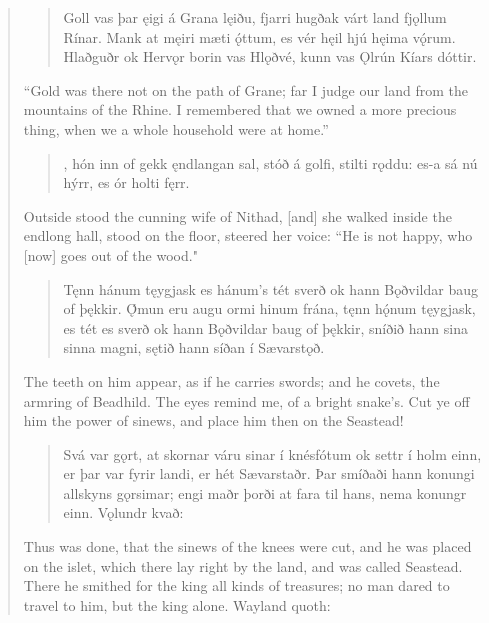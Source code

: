 \begin{verse}
\begin{verse}
\bva Goll vas þar ęigi \hld á Grana lęiðu,
fjarri hugðak várt land \hld fjǫllum Rínar.
Mank at męiri \hld mæti ǫ́ttum,
es vér hęil hjú \hld hęima vǫ́rum. \\%
Hlaðguðr ok Hervǫr \hld borin vas Hlǫðvé,
kunn vas Ǫlrún \hld Kíars dóttir.  \\%
\end{verse}

\bvb “Gold was there not on the path of Grane; far I judge our land from the mountains of the Rhine. I remembered that we owned a more precious thing, when we a whole household were at home.”

\begin{verse}
,
hón inn of gekk \hld ęndlangan sal,
stóð á golfi, \hld stilti rǫddu:
es-a sá nú hýrr, \hld es ór holti fęrr. \\%
\end{verse}

\bvb Outside stood the cunning wife of Nithad, [and] she walked inside the endlong hall, stood on the floor, steered her voice: “He is not happy, who [now] goes out of the wood."

\begin{verse}
\bva Tęnn hánum tęygjask \hld es hánum's tét sverð
ok hann Bǫðvildar \hld baug of þękkir.
Ǫ́mun eru augu \hld ormi hinum frána,
tęnn hǫ́num tęygjask, \hld es tét es sverð
ok hann Bǫðvildar \hld baug of þękkir,
sníðið hann sina \hld sinna magni,
sętið hann síðan \hld í Sævarstǫð. \\%
\end{verse}

\bvb The teeth on him appear, as if he carries swords; and he covets, the armring of Beadhild. The eyes remind me, of a bright snake's. Cut ye off him the power of sinews, and place him then on the Seastead!

\begin{verse}
\bva Svá var gǫrt, at skornar váru sinar í knésfótum ok settr í holm einn, er þar var fyrir landi, er hét Sævarstaðr. Þar smíðaði hann konungi allskyns gǫrsimar; engi maðr þorði at fara til hans, nema konungr einn. Vǫlundr kvað: \\%
\end{verse}

\bvb Thus was done, that the sinews of the knees were cut, and he was placed on the islet, which there lay right by the land, and was called Seastead. There he smithed for the king all kinds of treasures; no man dared to travel to him, but the king alone. Wayland quoth: \\


\end{verse}
